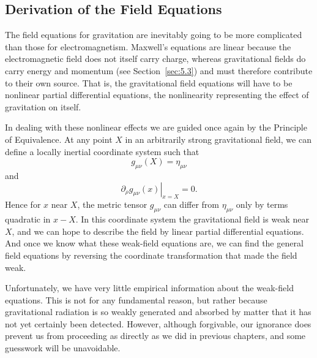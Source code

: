 
\subsection{Derivation of the Field Equations}\label{sec:7.1}

The field equations for gravitation are inevitably going to be more
complicated than those for electromagnetism. Maxwell's equations are linear
because the electromagnetic field does not itself carry charge, whereas
gravitational fields do carry energy and momentum (see
Section~\ref{sec:5.3}) and must therefore contribute to their own source.
That is, the gravitational field equations will have to be nonlinear partial
differential equations, the nonlinearity representing the effect of
gravitation on itself.

In dealing with these nonlinear effects we are guided once again by the
Principle of Equivalence. At any point \(X\) in an arbitrarily strong
gravitational field, we can define a locally inertial coordinate system such
that
\begin{equation}
  g_{\mu\nu}(X)=\eta_{\mu\nu}
  \tag{7.1.1}\label{eq:7.1.1}
\end{equation}
and
\begin{equation}
  \left.\partial_\rho g_{\mu\nu}(x)\right|_{x=X}=0.
  \tag{7.1.2}\label{eq:7.1.2}
\end{equation}
Hence for \(x\) near \(X\), the metric tensor \(g_{\mu\nu}\) can differ from
\(\eta_{\mu\nu}\) only by terms quadratic in \(x-X\). In this coordinate
system the gravitational field is weak near \(X\), and we can hope to
describe the field by linear partial differential equations. And once we
know what these weak-field equations are, we can find the general field
equations by reversing the coordinate transformation that made the field
weak.

Unfortunately, we have very little empirical information about the weak-field
equations. This is not for any fundamental reason, but rather because
gravitational radiation is so weakly generated and absorbed by matter that it
has not yet certainly been detected. However, although forgivable, our
ignorance does prevent us from proceeding as directly as we did in previous
chapters, and some guesswork will be unavoidable.

